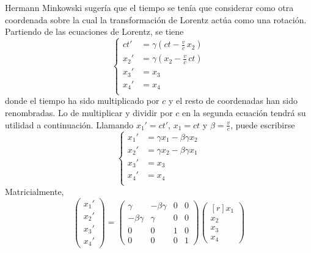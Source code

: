 \documentclass[12pt]{report}
\begin{document}
Hermann Minkowski sugería que el tiempo se tenía que considerar como otra coordenada sobre la cual la transformación de Lorentz actúa como una rotación. Partiendo de las ecuaciones de Lorentz, se tiene
\[
\left\{
\begin{aligned}
    ct' &= \gamma(ct-\frac{v}{c} \, x_2) \\
    x_2' &= \gamma(x_2-\frac{v}{c} \, ct) \\
    x_3' &= x_3 \\
    x_4' &= x_4 \\
\end{aligned}
\right.
\]
donde el tiempo ha sido multiplicado por $c$ y el resto de coordenadas han sido renombradas. Lo de multiplicar y dividir por $c$ en la segunda ecuación tendrá su utilidad a continuación. Llamando $x_1' = ct'$, $x_1 = ct$ y $\beta = \frac{v}{c}$, puede escribirse
\[
\left\{
\begin{aligned}
    x_1' &= \gamma x_1-\beta \gamma x_2 \\
    x_2' &= \gamma x_2-\beta \gamma x_1 \\
    x_3' &= x_3 \\
    x_4' &= x_4 \\
\end{aligned}
\right.
\]
Matricialmente,
\[
\begin{pmatrix}
    x_1' \\
    x_2' \\
    x_3' \\
    x_4'
\end{pmatrix} = \begin{pmatrix}
    \gamma & -\beta \gamma & 0 & 0 \\
    -\beta \gamma & \gamma  & 0 & 0 \\
    0 & 0 & 1 & 0 \\
    0 & 0 & 0 & 1
\end{pmatrix} \begin{pmatrix*}[r]
    x_1 \\
    x_2 \\
    x_3 \\
    x_4
\end{pmatrix*}
\]
\end{document}
